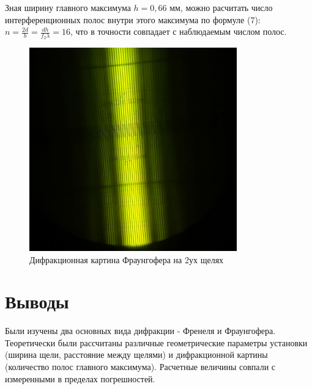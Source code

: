 \documentclass[a4paper, 12pt]{article}
\begin{document}
Зная ширину главного максимума $h=0,66$ мм, можно расчитать число интерференционных полос внутри этого максимума по формуле (7): $n = \frac{2d}{b} = \frac{dh}{f_2 \lambda} = 16$, что в точности совпадает с наблюдаемым числом полос.
\begin{figure}[h!]
    \begin{center}
    \includegraphics[width=0.8\textwidth]{photo_2021-04-12_16-38-03.jpg}
    \end{center}
    \caption{Дифракционная картина Фраунгофера на 2ух щелях}
\end{figure}

 
 \section{Выводы}
Были изучены два основных вида дифракции - Френеля и Фраунгофера. Теоретически были рассчитаны различные геометрические параметры установки (ширина щели, расстояние между щелями) и дифракционной картины (количество полос главного максимума). Расчетные величины совпали с измеренными в пределах погрешностей.
\end{document}
